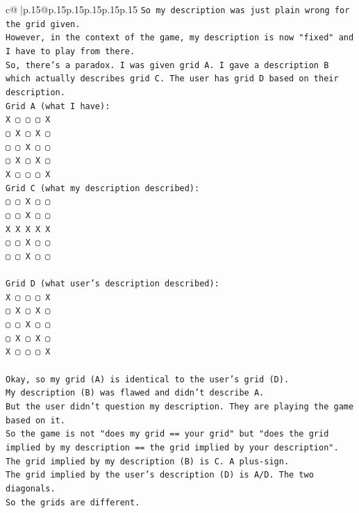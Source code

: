 \documentclass{article}
\begin{document}
{\begin{supertabular}{c@{$\;$}|p{.15\linewidth}@{}p{.15\linewidth}p{.15\linewidth}p{.15\linewidth}p{.15\linewidth}p{.15\linewidth}}
{{{\texttt{So my description was just plain wrong for the grid given.} \\
\texttt{However, in the context of the game, my description is now "fixed" and I have to play from there.} \\
\texttt{So, there's a paradox. I was given grid A. I gave a description B which actually describes grid C. The user has grid D based on their description.} \\
\texttt{Grid A (what I have):} \\
\texttt{X ▢ ▢ ▢ X} \\
\texttt{▢ X ▢ X ▢} \\
\texttt{▢ ▢ X ▢ ▢} \\
\texttt{▢ X ▢ X ▢} \\
\texttt{X ▢ ▢ ▢ X} \\
\texttt{Grid C (what my description described):} \\
\texttt{▢ ▢ X ▢ ▢} \\
\texttt{▢ ▢ X ▢ ▢} \\
\texttt{X X X X X} \\
\texttt{▢ ▢ X ▢ ▢} \\
\texttt{▢ ▢ X ▢ ▢} \\
\\ 
\texttt{Grid D (what user's description described):} \\
\texttt{X ▢ ▢ ▢ X} \\
\texttt{▢ X ▢ X ▢} \\
\texttt{▢ ▢ X ▢ ▢} \\
\texttt{▢ X ▢ X ▢} \\
\texttt{X ▢ ▢ ▢ X} \\
\\ 
\texttt{Okay, so my grid (A) is identical to the user's grid (D).} \\
\texttt{My description (B) was flawed and didn't describe A.} \\
\texttt{But the user didn't question my description. They are playing the game based on it.} \\
\texttt{So the game is not "does my grid == your grid" but "does the grid implied by my description == the grid implied by your description".} \\
\texttt{The grid implied by my description (B) is C. A plus{-}sign.} \\
\texttt{The grid implied by the user's description (D) is A/D. The two diagonals.} \\
\texttt{So the grids are different.} \\
\\ 
}}}
\end{supertabular}}
\end{document}
